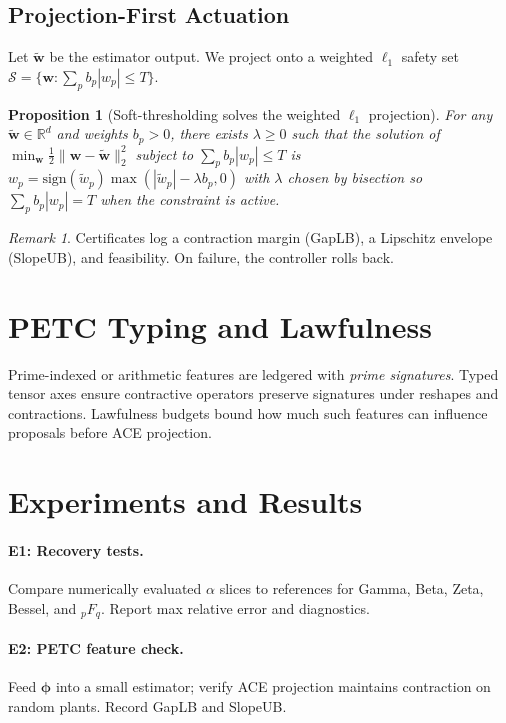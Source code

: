 \documentclass[11pt]{article}
\newtheorem{proposition}{Proposition}
\theoremstyle{remark}
\newtheorem{remark}{Remark}
\newcommand{\R}{\mathbb{R}}
\begin{document}
\subsection{Projection-First Actuation}
Let \(\tilde{\bm{w}}\) be the estimator output. We project onto a weighted \(\ell_1\) safety set \(\mathcal{S}=\{\bm{w}:\sum_p b_p|w_p|\le T\}\).
\begin{proposition}[Soft-thresholding solves the weighted \(\ell_1\) projection]
For any \(\tilde{\bm{w}}\in\R^d\) and weights \(b_p>0\), there exists \(\lambda\ge0\) such that the solution of
\(\min_{\bm{w}}\tfrac12\|\bm{w}-\tilde{\bm{w}}\|_2^2\) subject to \(\sum_p b_p|w_p|\le T\) is \(w_p=\mathrm{sign}(\tilde w_p)\max(|\tilde w_p|-\lambda b_p,0)\) with \(\lambda\) chosen by bisection so \(\sum_p b_p|w_p|=T\) when the constraint is active.
\end{proposition}
\begin{remark}
Certificates log a contraction margin (GapLB), a Lipschitz envelope (SlopeUB), and feasibility. On failure, the controller rolls back.
\end{remark}

\section{PETC Typing and Lawfulness}
\label{sec:petc}
Prime-indexed or arithmetic features are ledgered with \emph{prime signatures}. Typed tensor axes ensure contractive operators preserve signatures under reshapes and contractions. Lawfulness budgets bound how much such features can influence proposals before ACE projection.

\section{Experiments and Results}
\label{sec:experiments}
\paragraph{E1: Recovery tests.} Compare numerically evaluated \(\alpha\) slices to references for Gamma, Beta, Zeta, Bessel, and \({}_pF_q\). Report max relative error and diagnostics.

\paragraph{E2: PETC feature check.} Feed \(\bm{\phi}\) into a small estimator; verify ACE projection maintains contraction on random plants. Record GapLB and SlopeUB.
\end{document}
